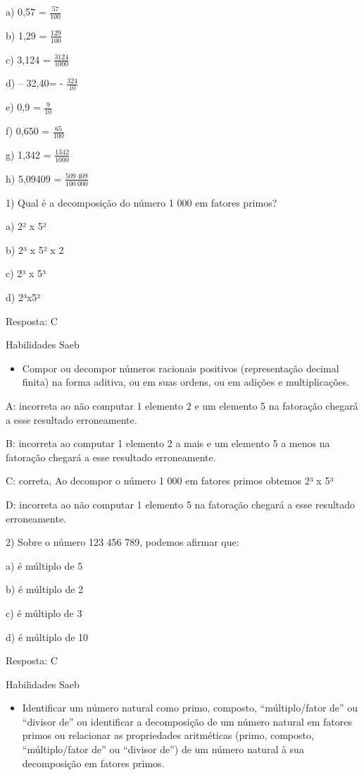 a) 0,57 = \(\frac{57}{100}\)

b) 1,29 = \(\frac{129}{100}\)

c) 3,124 = \(\frac{3124}{1000}\)

d) -- 32,40= - \(\frac{324}{10}\)

e) 0,9 = \(\frac{9}{10}\)

f) 0,650 = \(\frac{65}{100}\)

g) 1,342 = \(\frac{1342}{1000}\)

h) 5,09409 = \(\frac{509\ 409}{100\ 000}\)


1) Qual é a decomposição do número 1 000 em fatores primos?

a) 2² x 5²

b) 2³ x 5² x 2

c) 2³ x 5³

d) 2³x5²

Resposta: C

Habilidades Saeb

\begin{itemize}
\tightlist
\item
  Compor ou decompor números racionais positivos (representação decimal
  finita) na forma aditiva, ou em suas ordens, ou em adições e
  multiplicações.
\end{itemize}

A: incorreta ao não computar 1 elemento 2 e um elemento 5 na fatoração
chegará a esse resultado erroneamente.

B: incorreta ao computar 1 elemento 2 a mais e um elemento 5 a menos na
fatoração chegará a esse resultado erroneamente.

C: correta, Ao decompor o número 1 000 em fatores primos obtemos 2³ x 5³

D: incorreta ao não computar 1 elemento 5 na fatoração chegará a esse
resultado erroneamente.

2) Sobre o número 123 456 789, podemos afirmar que:

a) é múltiplo de 5

b) é múltiplo de 2

c) é múltiplo de 3

d) é múltiplo de 10

Resposta: C

Habilidades Saeb

\begin{itemize}
\tightlist
\item
  Identificar um número natural como primo, composto, ``múltiplo/fator
  de'' ou ``divisor de'' ou identificar a decomposição de um número
  natural em fatores primos ou relacionar as propriedades aritméticas
  (primo, composto, ``múltiplo/fator de'' ou ``divisor de'') de um
  número natural à sua decomposição em fatores primos.
\end{itemize}

